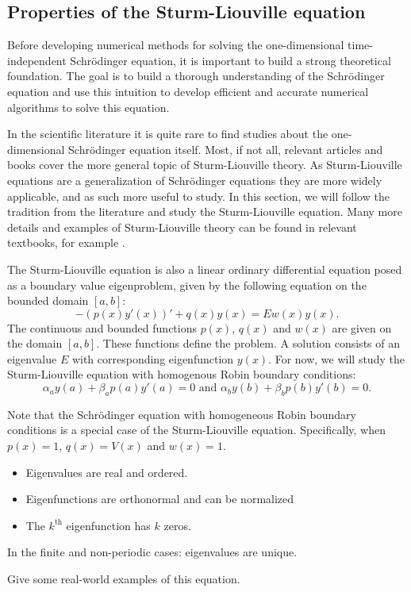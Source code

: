 \subsection{Properties of the Sturm-Liouville equation}

Before developing numerical methods for solving the one-dimensional time-independent Schrödinger equation, it is important to build a strong theoretical foundation. The goal is to build a thorough understanding of the Schrödinger equation and use this intuition to develop efficient and accurate numerical algorithms to solve this equation.

In the scientific literature it is quite rare to find studies about the one-dimensional Schrödinger equation itself. Most, if not all, relevant articles and books cover the more general topic of Sturm-Liouville theory. As Sturm-Liouville equations are a generalization of Schrödinger equations they are more widely applicable, and as such more useful to study. In this section, we will follow the tradition from the literature and study the Sturm-Liouville equation. Many more details and examples of Sturm-Liouville theory can be found in relevant textbooks, for example \cite[Chapter~5]{sagan_boundary_1961}.

The Sturm-Liouville equation is also a linear ordinary differential equation posed as a boundary value eigenproblem, given by the following equation on the bounded domain $[a, b]$:
$$
    -(p(x) y'(x))' + q(x) y(x) = E w(x) y(x)\text{.}
$$
The continuous and bounded functions $p(x)$, $q(x)$ and $w(x)$ are given on the domain $[a, b]$. These functions define the problem. A solution consists of an eigenvalue $E$ with corresponding eigenfunction $y(x)$. For now, we will study the Sturm-Liouville equation with homogenous Robin boundary conditions:
$$
    \alpha_a y(a) + \beta_a p(a) y'(a) = 0 \text{ and } \alpha_b y(b) + \beta_b p(b) y'(b) = 0\text{.}
$$

Note that the Schrödinger equation with homogeneous Robin boundary conditions is a special case of the Sturm-Liouville equation. Specifically, when $p(x) = 1$, $q(x) = V(x)$ and $w(x) = 1$.

    {\color{red}

        \begin{itemize}
            \item Eigenvalues are real and ordered.
            \item Eigenfunctions are orthonormal and can be normalized
            \item The $k^\text{th}$ eigenfunction has $k$ zeros.
        \end{itemize}

        In the finite and non-periodic cases: eigenvalues are unique.

        Give some real-world examples of this equation.
    }

